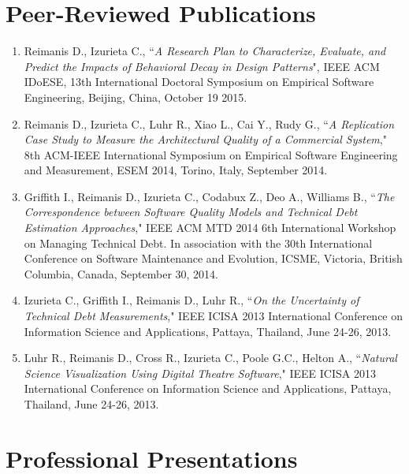 \documentclass[a4paper,10pt]{article} %
\begin{document}
\section{Peer-Reviewed Publications}
\begin{enumerate}
\item{Reimanis D., Izurieta C., ``\emph{A Research Plan to Characterize, Evaluate, and Predict the Impacts of Behavioral Decay in Design Patterns}", IEEE ACM IDoESE, 13th International Doctoral Symposium on Empirical Software Engineering, Beijing, China, October 19 2015.}
	
\item{Reimanis D., Izurieta C., Luhr R., Xiao L., Cai Y., Rudy G., ``\emph{A Replication Case Study to Measure the 
Architectural Quality of a Commercial System}," 8th ACM-IEEE International Symposium on Empirical
Software Engineering and Measurement, ESEM 2014, Torino, Italy, September 2014.}

\item{Griffith I., Reimanis D., Izurieta C., Codabux Z., Deo A., Williams B., ``\emph{The Correspondence between Software Quality Models and Technical Debt Estimation Approaches}," IEEE ACM MTD 2014 6th International Workshop on Managing Technical Debt. In association with the 30th International Conference on Software Maintenance and Evolution, ICSME, Victoria, British Columbia, Canada, September 30, 2014.}

\item{Izurieta C., Griffith I., Reimanis D., Luhr R., ``\emph{On the Uncertainty of Technical Debt 
Measurements}," IEEE ICISA 2013 International Conference on Information Science and Applications, 
Pattaya, Thailand, June 24-26, 2013.}

\item{Luhr R., Reimanis D., Cross R., Izurieta C., Poole G.C., Helton A., ``\emph{Natural Science Visualization Using Digital Theatre Software}," IEEE ICISA 2013 International Conference on Information Science and Applications, Pattaya, Thailand, June 24-26, 2013.}

\end{enumerate}



\section{Professional Presentations}
\end{document}
